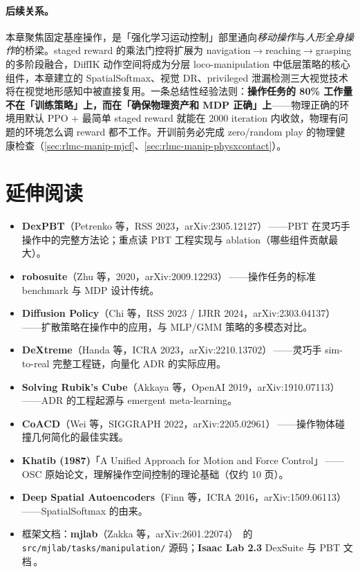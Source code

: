\paragraph{后续关系。}本章聚焦固定基座操作，是「强化学习运动控制」部里通向\emph{移动操作}与\emph{人形全身操作}的桥梁。staged reward 的乘法门控将扩展为 navigation$\to$reaching$\to$grasping 的多阶段融合，DiffIK 动作空间将成为分层 loco-manipulation 中低层策略的核心组件，本章建立的 SpatialSoftmax、视觉 DR、privileged 泄漏检测三大视觉技术将在视觉地形感知中被直接复用。一条总结性经验法则：\textbf{操作任务的 80\% 工作量不在「训练策略」上，而在「确保物理资产和 MDP 正确」上}——物理正确的环境用默认 PPO + 最简单 staged reward 就能在 2000 iteration 内收敛，物理有问题的环境怎么调 reward 都不工作。开训前务必完成 zero/random play 的物理健康检查（\cref{sec:rlmc-manip-mjcf}、\cref{sec:rlmc-manip-physxcontact}）。

\section*{延伸阅读}
\label{sec:rlmc-manip-reading}

\begin{itemize}
  \item \textbf{DexPBT}（Petrenko 等，RSS 2023，arXiv:2305.12127）\,\cite{petrenko2023dexpbt}——PBT 在灵巧手操作中的完整方法论；重点读 PBT 工程实现与 ablation（哪些组件贡献最大）。
  \item \textbf{robosuite}（Zhu 等，2020，arXiv:2009.12293）\,\cite{zhu2020robosuite}——操作任务的标准 benchmark 与 MDP 设计传统。
  \item \textbf{Diffusion Policy}（Chi 等，RSS 2023 / IJRR 2024，arXiv:2303.04137）\,\cite{chi2023diffusion}——扩散策略在操作中的应用，与 MLP/GMM 策略的多模态对比。
  \item \textbf{DeXtreme}（Handa 等，ICRA 2023，arXiv:2210.13702）\,\cite{handa2023dextreme}——灵巧手 sim-to-real 完整工程链，向量化 ADR 的实际应用。
  \item \textbf{Solving Rubik's Cube}（Akkaya 等，OpenAI 2019，arXiv:1910.07113）\,\cite{akkaya2019rubik}——ADR 的工程起源与 emergent meta-learning。
  \item \textbf{CoACD}（Wei 等，SIGGRAPH 2022，arXiv:2205.02961）\,\cite{wei2022coacd}——操作物体碰撞几何简化的最佳实践。
  \item \textbf{Khatib (1987)}「A Unified Approach for Motion and Force Control」\,\cite{khatib1987operational}——OSC 原始论文，理解操作空间控制的理论基础（仅约 10 页）。
  \item \textbf{Deep Spatial Autoencoders}（Finn 等，ICRA 2016，arXiv:1509.06113）\,\cite{finn2016dsae}——SpatialSoftmax 的由来。
  \item 框架文档：\textbf{mjlab}（Zakka 等，arXiv:2601.22074）\,\cite{zakka2026mjlab} 的 \verb|src/mjlab/tasks/manipulation/| 源码；\textbf{Isaac Lab 2.3} DexSuite 与 PBT 文档\,\cite{nvidia2025isaaclab23}。
\end{itemize}

